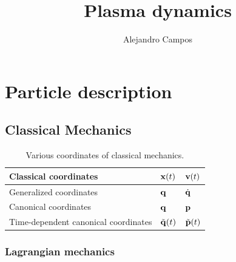 \documentclass[oneside,a4paper,11pt]{report}
\title{Plasma dynamics}
\author{Alejandro Campos}
\newcommand{\qvecdot}{\dot{\qvec}}
\begin{document}
\maketitle
\tableofcontents

%
%
\part{Particle description}
%
%

\chapter{Classical Mechanics}
\begin{table}[H]
\renewcommand{\arraystretch}{1.5}
\centering
\caption{Various coordinates of classical mechanics. }
\label{tb:classical_mechanics_coordinates}
 \begin{tabular}{l|l|l}
    Classical coordinates & $\mathbf{x}(t)$ & $\mathbf{v}(t)$ \\
    \hline
    Generalized coordinates  & $\mathbf{q}$ & $\qvecdot$ \\
    \hline
    Canonical coordinates & $\mathbf{q}$ & $\mathbf{p}$ \\
    \hline
    Time-dependent canonical coordinates & $\tilde{\mathbf{q}}(t)$ & $ \tilde{\mathbf{p}}(t)$ \\
 \end{tabular}
\end{table}

\section{Lagrangian mechanics}
\end{document}
